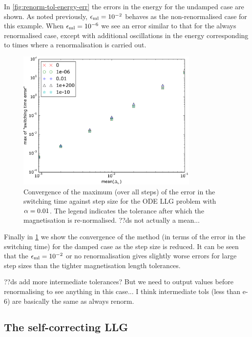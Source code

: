 In \cref{fig:renorm-tol-energy-err} the errors in the energy for the undamped case are shown.
As noted previously, $\epsilon_{\mathrm{ml}}= 10^{-2}$ behaves as the non-renormalised case for this example.
When $\epsilon_{\mathrm{ml}} = 10^{-6}$ we see an error similar to that for the always renormalised case, except with additional oscillations in the energy corresponding to times where a renormalisation is carried out.


\begin{figure}
  \centering
  \includegraphics[width=0.8\textwidth]{plots/tolrenorm_llg_ode_convergence/maxofswitchingtimeerrorvsmeanofdts}
  \caption{
    Convergence of the maximum (over all steps) of the error in the switching time
    against step size
    for the ODE LLG problem with
    $\alpha = 0.01$.
    The legend indicates the tolerance after which the magnetisation is re-normalised.
    ??ds not actually a mean...
  }
  \label{fig:tol-renorm-convergence}
\end{figure}

Finally in \cref{fig:tol-renorm-convergence} we show the convergence of the method (in terms of the error in the switching time) for the damped case as the step size is reduced.
It can be seen that the $\epsilon_{\mathrm{ml}}=10^{-2}$ or no renormalisation gives slightly worse errors for large step sizes than the tighter magnetisation length tolerances.

??ds add more intermediate tolerances? But we need to output values before renormalising to see anything in this case... I think intermediate tols (less than e-6) are basically the same as always renorm.


\FloatBarrier
\subsection{The self-correcting LLG}
\label{sec:self-correcting-llg-results}


